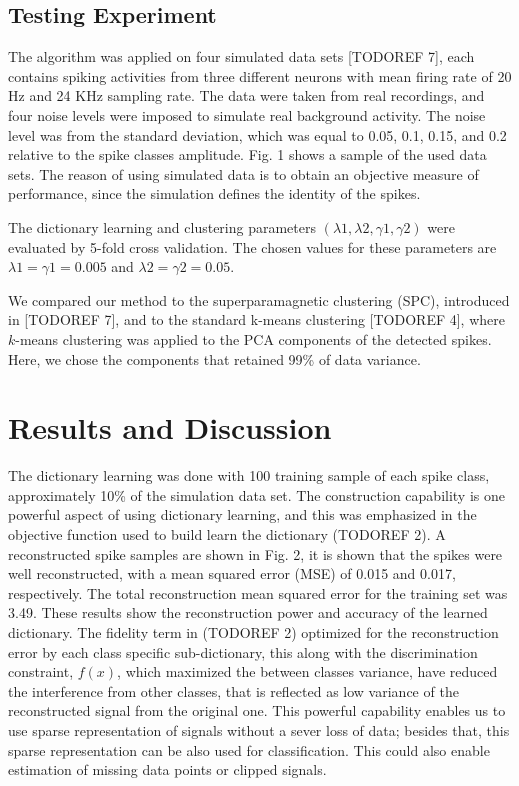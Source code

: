 \documentclass[conference]{IEEEtran}
\begin{document}
	\subsection{Testing Experiment}
	The algorithm was applied on four simulated data sets [TODOREF 7], each contains spiking activities from three different neurons with mean firing rate of 20 Hz and 24 KHz sampling rate. The data were taken from real recordings, and four noise levels were imposed to simulate real background activity. The noise level was from the standard deviation, which was equal to 0.05, 0.1, 0.15, and 0.2 relative to the spike classes amplitude. Fig. 1 shows a sample of the used data sets. The reason of using simulated data is to obtain an objective measure of performance, since the simulation defines the identity of the spikes.
	
	The dictionary learning and clustering parameters
	$(\lambda1, \lambda2, \gamma1, \gamma2)$ were evaluated by 5-fold cross validation. The chosen values for these parameters are $\lambda1 = \gamma1 = 0.005$ and $\lambda2 = \gamma2 = 0.05$.
	
	We compared our method to the superparamagnetic clustering (SPC), introduced in [TODOREF 7], and to the standard k-means clustering [TODOREF 4], where $k$-means clustering was applied to the PCA components of the detected spikes. Here, we chose the components that retained 99\% of data variance.
	
 	\section{Results and Discussion}
	The dictionary learning was done with 100 training sample of each spike class, approximately 10\% of the simulation data set. The construction capability is one powerful aspect of using dictionary learning, and this was emphasized in the objective function used to build learn the dictionary (TODOREF 2). A reconstructed spike samples are shown in Fig. 2, it is shown that the spikes were well reconstructed, with a mean squared error (MSE) of 0.015 and 0.017, respectively. The total reconstruction mean squared error for the training set was 3.49. These results show the reconstruction power and accuracy of the learned dictionary. The fidelity term in (TODOREF 2) optimized for the reconstruction error by each class specific sub-dictionary, this along with the discrimination constraint, $f(x)$, which maximized the between classes variance, have reduced the interference from other classes, that is reflected as low variance of the reconstructed signal from the original one. This powerful capability enables us to use sparse representation of signals without a sever loss of data; besides that, this sparse representation can be also used for classification. This could also enable estimation of missing data points or clipped signals.
	
\end{document}
